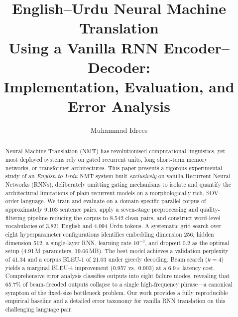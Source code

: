 \documentclass[runningheads]{llncs}
\begin{document}

\title{English--Urdu Neural Machine Translation\\
Using a Vanilla RNN Encoder--Decoder:\\
Implementation, Evaluation, and Error Analysis}


\author{Muhammad Idrees}



\maketitle

\begin{abstract}
Neural Machine Translation (NMT) has revolutionised computational linguistics,
yet most deployed systems rely on gated recurrent units, long short-term memory
networks, or transformer architectures. This paper presents a rigorous
experimental study of an \emph{English-to-Urdu} NMT system built
\emph{exclusively} on vanilla Recurrent Neural Networks (RNNs), deliberately
omitting gating mechanisms to isolate and quantify the architectural limitations
of plain recurrent models on a morphologically rich, SOV-order language. We
train and evaluate on a domain-specific parallel corpus of approximately
9{,}103 sentence pairs, apply a seven-stage preprocessing and quality-filtering
pipeline reducing the corpus to 8{,}542 clean pairs, and construct word-level
vocabularies of 3{,}821 English and 4{,}094 Urdu tokens. A systematic grid
search over eight hyperparameter configurations identifies embedding dimension
256, hidden dimension 512, a single-layer RNN, learning rate $10^{-3}$, and
dropout 0.2 as the optimal setup (4.91\,M parameters, 19.66\,MB). The best
model achieves a validation perplexity of 41.34 and a corpus BLEU-1 of 21.03
under greedy decoding. Beam search ($k{=}4$) yields a marginal BLEU-4
improvement (0.957 vs.\ 0.903) at a 6.9$\times$ latency cost. Comprehensive
error analysis classifies outputs into eight failure modes, revealing that
65.7\% of beam-decoded outputs collapse to a single high-frequency
phrase---a canonical symptom of the fixed-size bottleneck problem. Our work
provides a fully reproducible empirical baseline and a detailed error taxonomy
for vanilla RNN translation on this challenging language pair.

\end{abstract}
\end{document}
